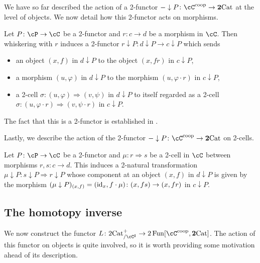 \documentclass[11pt, dvipsnames]{amsart}
\begin{document}
We have so far described the action of a 2-functor $-\downarrow P\colon\cC^\coop\to\ttwocat$ at the level of objects. We now detail how this 2-functor acts on morphisms. 

\begin{defn}\label{defn:induced-2functor-comma}
     Let $P\colon\cP\to\cC$ be a 2-functor and $r\colon c\to d$ be a morphism in $\cC$. Then whiskering with $r$ induces a 2-functor $r\downarrow P\colon d\downarrow P\to c\downarrow P$ which sends
\begin{itemize}[leftmargin=*]
    \item an object $(x,f)$ in $d\downarrow P$ to the object $(x,f r)$ in $c\downarrow P$,
    \item a morphism $(u,\varphi)$ in $d\downarrow P$ to the morphism $(u,\varphi\cdot r)$ in $c\downarrow P$,
    \item a 2-cell $\sigma\colon(u,\varphi)\Rightarrow(v,\psi)$ in $d\downarrow P$ to itself regarded as a 2-cell $\sigma\colon (u,\varphi\cdot r)\Rightarrow(v,\psi\cdot r)$ in $c\downarrow P$.
\end{itemize}
The fact that this is a 2-functor is established in \cite[Proposition 7.1.9]{Niles2021}. 
\end{defn}

Lastly, we describe the action of the 2-functor $-\downarrow P\colon\cC^\coop\to\ttwocat$ on 2-cells.

\begin{defn} \label{defn:induced-2-natural-comma}
    Let $P\colon\cP\to\cC$ be a 2-functor and $\mu\colon r\Rightarrow s$ be a 2-cell in $\cC$ between morphisms $r,s\colon c\to d$. This induces a 2-natural transformation $\mu\downarrow P\colon s\downarrow P\Rightarrow r\downarrow P$ whose component at an object $(x,f)$ in $d\downarrow P$ is given by the morphism $(\mu\downarrow P)_{(x,f)}=(\mathrm{id}_x,f\cdot\mu)\colon (x,f s)\to(x,f r)$ in $c\downarrow P$.
\end{defn}

   
\subsection{The homotopy inverse}\label{subsec.defn.L}

We now construct the functor $L\colon\mslicetwocat\to 2\Fun[\cC^\coop,\ttwocat]$. The action of this functor on objects is quite involved, so it is worth providing some motivation ahead of its description. 
\end{document}

